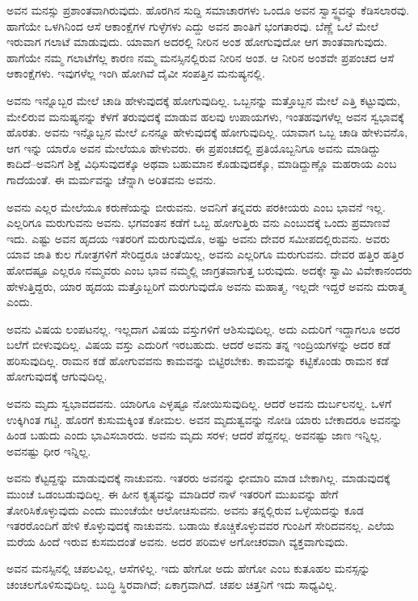 ಅವನ ಮನಸ್ಸು ಪ್ರಶಾಂತವಾಗಿರುವುದು. ಹೊರಗಿನ ಸುದ್ದಿ ಸಮಾಚಾರಗಳು ಒಂದೂ ಅವನ ಸ್ವಾಸ್ಥ್ಯವನ್ನು ಕೆಡಿಸಲಾರವು. ಹಾಗೆಯೇ ಒಳಗಿನಿಂದ ಆಸೆ ಆಕಾಂಕ್ಷೆಗಳ ಗುಳ್ಳೆಗಳು ಎದ್ದು ಅವನ ಶಾಂತಿಗೆ ಭಂಗತಾರವು. ಬೆಣ್ಣೆ ಒಲೆ ಮೇಲೆ ಇರುವಾಗ ಗಲಾಟೆ ಮಾಡುವುದು. ಯಾವಾಗ ಅದರಲ್ಲಿ ನೀರಿನ ಅಂಶ ಹೋಗುವುದೋ ಆಗ ಶಾಂತವಾಗುವುದು. ಹಾಗೆಯೇ ನಮ್ಮ ಗಲಾಟೆಗೆಲ್ಲ ಕಾರಣ ನಮ್ಮ ಮನಸ್ಸಿನಲ್ಲಿರುವ ನೀರಿನ ಅಂಶ. ಆ ನೀರಿನ ಅಂಶವೇ ಪ್ರಪಂಚದ ಆಸೆ ಆಕಾಂಕ್ಷೆಗಳು. ಇವುಗಳೆಲ್ಲ ಇಂಗಿ ಹೋಗಿವೆ ದೈವೀ ಸಂಪತ್ತಿನ ಮನುಷ್ಯನಲ್ಲಿ.

ಅವನು ಇನ್ನೊಬ್ಬರ ಮೇಲೆ ಚಾಡಿ ಹೇಳುವುದಕ್ಕೆ ಹೋಗುವುದಿಲ್ಲ. ಒಬ್ಬನನ್ನು ಮತ್ತೊಬ್ಬನ ಮೇಲೆ ಎತ್ತಿ ಕಟ್ಟುವುದು, ಮೇಲಿರುವ ಮನುಷ್ಯನನ್ನು ಕೆಳಗೆ ತರುವುದಕ್ಕೆ ಮಾಡುವ ಹಲವು ಉಪಾಯಗಳು, ಇಂತಹವುಗಳೆಲ್ಲ ಅವನ ಸ್ವಭಾವಕ್ಕೆ ಹೊರತು. ಅವನು ಇನ್ನೊಬ್ಬನ ಮೇಲೆ ಏನನ್ನೂ ಹೇಳುವುದಕ್ಕೆ ಹೋಗುವುದಿಲ್ಲ. ಯಾವಾಗ ಒಬ್ಬ ಚಾಡಿ ಹೇಳುವನೊ, ಆಗ ಇನ್ನು ಯಾರೊ ಅವನ ಮೇಲೆಯೂ ಹೇಳುವರು. ಈ ಪ್ರಪಂಚದಲ್ಲಿ ಪ್ರತಿಯೊಬ್ಬನಿಗೂ ಅವನು ಮಾಡಿದ್ದು ಕಾದಿದೆ–ಅವನಿಗೆ ಶಿಕ್ಷೆ ವಿಧಿಸುವುದಕ್ಕೊ ಅಥವಾ ಬಹುಮಾನ ಕೊಡುವುದಕ್ಕೊ, ಮಾಡಿದ್ದುಣ್ಣೊ ಮಹರಾಯ ಎಂಬ ಗಾದೆಯಂತೆ. ಈ ಮರ್ಮವನ್ನು ಚೆನ್ನಾಗಿ ಅರಿತವನು ಅವನು.

ಅವನು ಎಲ್ಲರ ಮೇಲೆಯೂ ಕರುಣೆಯನ್ನು ಬೀರುವನು. ಅವನಿಗೆ ತನ್ನವರು ಪರಕೀಯರು ಎಂಬ ಭಾವನೆ ಇಲ್ಲ. ಎಲ್ಲರಿಗೂ ಮರುಗುವನು ಅವನು. ಭಗವಂತನ ಕಡೆಗೆ ಒಬ್ಬ ಹೋಗುತ್ತಿರು ವನು ಎಂಬುದಕ್ಕೆ ಒಂದು ಪ್ರಮಾಣವೆ ಇದು. ಎಷ್ಟು ಅವನ ಹೃದಯ ಇತರರಿಗೆ ಮರುಗುವುದೊ, ಅಷ್ಟು ಅವನು ದೇವರ ಸಮೀಪದಲ್ಲಿರುವನು. ಅವರು ಯಾವ ಜಾತಿ ಕುಲ ಗೋತ್ರಗಳಿಗೆ ಸೇರಿದ್ದರೂ ಚಿಂತೆಯಿಲ್ಲ, ಅವನು ಎಲ್ಲರಿಗೂ ಮರುಗುವನು. ದೇವರ ಹತ್ತಿರ ಹತ್ತಿರ ಹೋದಷ್ಟೂ ಎಲ್ಲರೂ ನಮ್ಮವರು ಎಂಬ ಭಾವ ನಮ್ಮಲ್ಲಿ ಜಾಗ್ರತವಾಗುತ್ತ ಬರುವುದು. ಅದಕ್ಕೇ ಸ್ವಾಮಿ ವಿವೇಕಾನಂದರು ಹೇಳುತ್ತಿದ್ದರು, ಯಾರ ಹೃದಯ ಮತ್ತೊಬ್ಬರಿಗೆ ಮರುಗುವುದೊ ಅವನು ಮಹಾತ್ಮ, ಇಲ್ಲದೇ ಇದ್ದರೆ ಅವನು ದುರಾತ್ಮ ಎಂದು.

ಅವನು ವಿಷಯ ಲಂಪಟನಲ್ಲ. ಇಲ್ಲದಾಗ ವಿಷಯ ವಸ್ತುಗಳಿಗೆ ಆಶಿಸುವುದಿಲ್ಲ. ಅದು ಎದುರಿಗೆ ಇದ್ದಾಗಲೂ ಅದರ ಬಲೆಗೆ ಬೀಳುವುದಿಲ್ಲ. ವಿಷಯ ವಸ್ತು ಎದುರಿಗೆ ಇರಬಹುದು. ಆದರೆ ಅವನು ತನ್ನ ಇಂದ್ರಿಯಗಳನ್ನು ಅದರ ಕಡೆ ಹರಿಸುವುದಿಲ್ಲ. ರಾಮನ ಕಡೆ ಹೋಗುವವನು ಕಾಮವನ್ನು ಬಿಟ್ಟಿರಬೇಕು. ಕಾಮವನ್ನು ಕಟ್ಟಿಕೊಂಡು ರಾಮನ ಕಡೆ ಹೋಗುವುದಕ್ಕೆ ಆಗುವುದಿಲ್ಲ.

ಅವನು ಮೃದು ಸ್ವಭಾವದವನು. ಯಾರಿಗೂ ಎಳ್ಳಷ್ಟೂ ನೋಯಿಸುವುದಿಲ್ಲ. ಆದರೆ ಅವನು ದುರ್ಬಲನಲ್ಲ. ಒಳಗೆ ಉಕ್ಕಿಗಿಂತ ಗಟ್ಚಿ. ಹೊರಗೆ ಕುಸುಮಕ್ಕಿಂತ ಕೋಮಲ. ಅವನ ಮೃದುತ್ವವನ್ನು ನೋಡಿ ಯಾರು ಬೇಕಾದರೂ ಅವನನ್ನು ಹಿಂಡ ಬಹುದು ಎಂದು ಭಾವಿಸಬಾರದು. ಅವನು ಮೃದು ಸರಳ; ಆದರೆ ಪೆದ್ದನಲ್ಲ. ಅವನಷ್ಟು ಜಾಣ ಇನ್ನಿಲ್ಲ. ಅವನಷ್ಟು ಧೀರ ಇನ್ನಿಲ್ಲ.

ಅವನು ಕೆಟ್ಟದ್ದನ್ನು ಮಾಡುವುದಕ್ಕೆ ನಾಚುವನು. ಇತರರು ಅವನನ್ನು ಛೀಮಾರಿ ಮಾಡ ಬೇಕಾಗಿಲ್ಲ. ಮಾಡುವುದಕ್ಕೆ ಮುಂಚೆ ಒಡಂಬಡುವುದಿಲ್ಲ. ಈ ಹೀನ ಕೃತ್ಯವನ್ನು ಮಾಡಿದರೆ ನಾಳೆ ಇತರರಿಗೆ ಮುಖವನ್ನು ಹೇಗೆ ತೋರಿಸಿಕೊಳ್ಳುವುದು ಎಂದು ಮುಂಚೆಯೇ ಆಲೋಚಿಸುವನು. ಅವನು ತನ್ನಲ್ಲಿರುವ ಒಳ್ಳೆಯದನ್ನು ಕೂಡ ಇತರರೊಂದಿಗೆ ಹೇಳಿ ಕೊಳ್ಳುವುದಕ್ಕೆ ನಾಚುವನು. ಬಡಾಯಿ ಕೊಚ್ಚಿಕೊಳ್ಳುವವರ ಗುಂಪಿಗೆ ಸೇರಿದವನಲ್ಲ. ಎಲೆಯ ಮರೆಯ ಹಿಂದೆ ಇರುವ ಕುಸಮದಂತೆ ಅವನು. ಅದರ ಪರಿಮಳ ಅಗೋಚರವಾಗಿ ವ್ಯಕ್ತವಾಗುವುದು.

ಅವನ ಮನಸ್ಸಿನಲ್ಲಿ ಚಪಲವಿಲ್ಲ, ಆಸೆಗಳಿಲ್ಲ. ಇದು ಹೇಗೋ ಅದು ಹೇಗೋ ಎಂಬ ಕುತೂಹಲ ಮನಸ್ಸನ್ನು ಚಂಚಲಗೊಳಿಸುವುದಿಲ್ಲ. ಬುದ್ಧಿ ಸ್ಥಿರವಾಗಿದೆ; ಏಕಾಗ್ರವಾಗಿದೆ. ಚಪಲ ಚಿತ್ತನಿಗೆ ಇದು ಸಾಧ್ಯವಿಲ್ಲ.

